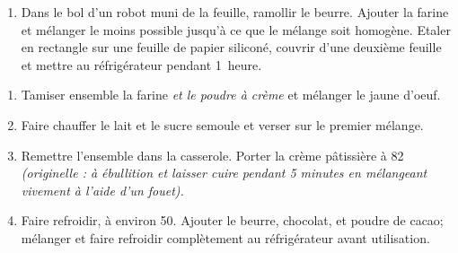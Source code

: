 



\begin{ingredients}
\end{ingredients}


\begin{recipe}
  \begin{enumerate}

  \item Dans le bol d’un robot muni de la feuille, ramollir le
    beurre.  Ajouter la farine et mélanger le moins possible jusqu’à ce
    que le mélange soit homogène. Etaler en rectangle sur une feuille
    de papier siliconé, couvrir d’une deuxième feuille et mettre au
    réfrigérateur pendant 1~heure.

  \end{enumerate}
\end{recipe}



\begin{ingredients}
\end{ingredients}


\begin{recipe}
  \begin{enumerate}

  \item Tamiser ensemble la farine \textit{et le poudre à crème} et mélanger le
    jaune d’oeuf.

  \item Faire chauffer le lait et le sucre semoule et verser sur le
    premier mélange.

  \item Remettre l’ensemble dans la casserole.  Porter la crème
    pâtissière à 82\C{} \textit{(originelle : à ébullition et laisser cuire pendant 5 minutes en
      mélangeant vivement à l’aide d’un fouet).}

  \item Faire refroidir, à environ 50\C. Ajouter le beurre, chocolat,
    et poudre de cacao; mélanger et faire refroidir complètement au
    réfrigérateur avant utilisation.

  \end{enumerate}
\end{recipe}

